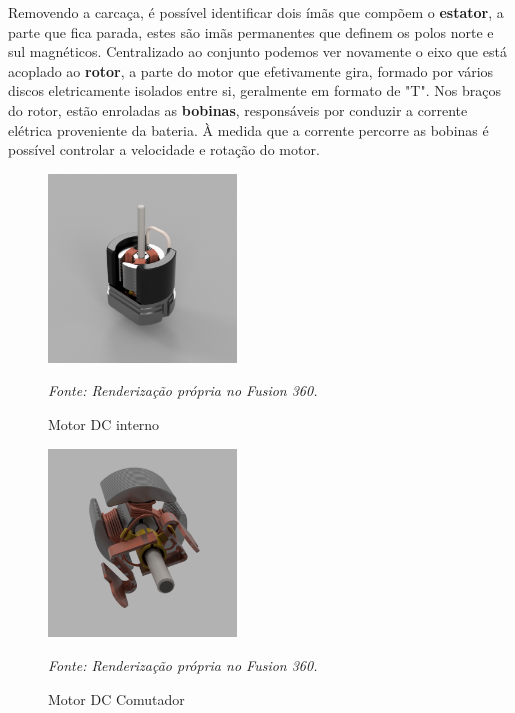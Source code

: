 \documentclass[11pt]{article}
\begin{document}
    Removendo a carcaça, é possível identificar dois ímãs que compõem o \textbf{estator}, a parte que fica parada, estes são imãs permanentes que definem os polos norte e sul 
    magnéticos. Centralizado ao conjunto podemos ver novamente o eixo que está acoplado ao \textbf{rotor}, a parte do motor que efetivamente gira, formado por vários discos eletricamente 
    isolados entre si, geralmente em formato de "T". Nos braços do rotor, estão enroladas as \textbf{bobinas}, responsáveis por conduzir a corrente elétrica 
    proveniente da bateria. À medida que a corrente percorre as bobinas é possível controlar a velocidade e rotação do motor.

    \begin{multicols}{2}
    
    \begin{figure}[H]
        \centering
        \includegraphics[width=5cm]{Renderizações/2 - DC.png}
        \caption{Motor DC interno}
        \footnotesize \textit{Fonte: Renderização própria no Fusion 360.}
        \label{2-DC}
    \end{figure}

    \begin{figure}[H]
        \centering
        \includegraphics[width=5cm]{Renderizações/3.1 - DC.png}
        \caption{Motor DC Comutador}
        \footnotesize \textit{Fonte: Renderização própria no Fusion 360.}
        \label{3-DC}
    \end{figure}

    \end{multicols}
\end{document}
